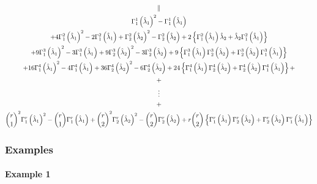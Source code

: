 \documentclass[12pt]{article}
\begin{document}
\begin{gather*}
\parallel \\
\Gamma _{1}^{1}\left( \hat{\lambda}_{1}\right) ^{2}-\Gamma _{1}^{1}\left( 
\hat{\lambda}_{1}\right) \\
+4\Gamma _{1}^{2}\left( \hat{\lambda}_{1}\right) ^{2}-2\Gamma _{1}^{2}\left( 
\hat{\lambda}_{1}\right) +\Gamma _{2}^{2}\left( \hat{\lambda}_{2}\right)
^{2}-\Gamma _{2}^{2}\left( \hat{\lambda}_{2}\right) +2\left\{ \Gamma
_{1}^{2}\left( \hat{\lambda}_{1}\right) \hat{\lambda}_{2}+\hat{\lambda}%
_{2}\Gamma _{1}^{2}\left( \hat{\lambda}_{1}\right) \right\} \\
+9\Gamma _{1}^{3}\left( \hat{\lambda}_{1}\right) ^{2}-3\Gamma _{1}^{3}\left( 
\hat{\lambda}_{1}\right) +9\Gamma _{2}^{3}\left( \hat{\lambda}_{2}\right)
^{2}-3\Gamma _{2}^{3}\left( \hat{\lambda}_{2}\right) +9\left\{ \Gamma
_{1}^{3}\left( \hat{\lambda}_{1}\right) \Gamma _{2}^{3}\left( \hat{\lambda}%
_{2}\right) +\Gamma _{2}^{3}\left( \hat{\lambda}_{2}\right) \Gamma
_{1}^{3}\left( \hat{\lambda}_{1}\right) \right\} \\
+16\Gamma _{1}^{4}\left( \hat{\lambda}_{1}\right) ^{2}-4\Gamma
_{1}^{4}\left( \hat{\lambda}_{1}\right) +36\Gamma _{2}^{4}\left( \hat{\lambda%
}_{2}\right) ^{2}-6\Gamma _{2}^{4}\left( \hat{\lambda}_{2}\right) +24\left\{
\Gamma _{1}^{4}\left( \hat{\lambda}_{1}\right) \Gamma _{2}^{4}\left( \hat{%
\lambda}_{2}\right) +\Gamma _{2}^{4}\left( \hat{\lambda}_{2}\right) \Gamma
_{1}^{4}\left( \hat{\lambda}_{1}\right) \right\} + \\
+ \\
\vdots \\
+ \\
\binom{r}{1}^{2}\Gamma _{1}^{r}\left( \hat{\lambda}_{1}\right) ^{2}-\binom{r%
}{1}\Gamma _{1}^{r}\left( \hat{\lambda}_{1}\right) +\binom{r}{2}^{2}\Gamma
_{2}^{r}\left( \hat{\lambda}_{2}\right) ^{2}-\binom{r}{2}\Gamma
_{2}^{r}\left( \hat{\lambda}_{2}\right) +r\binom{r}{2}\left\{ \Gamma
_{1}^{r}\left( \hat{\lambda}_{1}\right) \Gamma _{2}^{r}\left( \hat{\lambda}%
_{2}\right) +\Gamma _{2}^{r}\left( \hat{\lambda}_{2}\right) \Gamma
_{1}^{r}\left( \hat{\lambda}_{1}\right) \right\}
\end{gather*}

\subsubsection{Examples}

\paragraph{Example 1}
\end{document}

